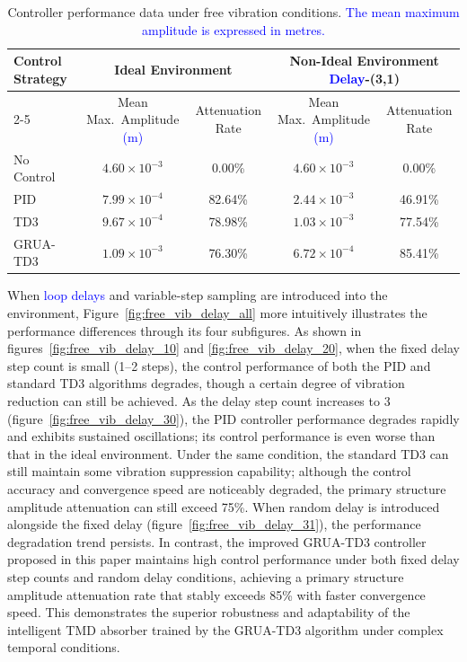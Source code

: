 \documentclass[review]{elsarticle}
\begin{document}
\begin{table}[htbp]
\centering
\caption{Controller performance data under free vibration conditions. \textcolor{blue}{The mean maximum amplitude is expressed in metres.}}
\label{tab:free_vib_data}
\small
\setlength{\tabcolsep}{4pt}
\begin{tabular}{lcccc} 
\toprule   
\multirow{2}{*}{Control Strategy} & \multicolumn{2}{c}{Ideal Environment} & \multicolumn{2}{c}{Non-Ideal Environment \textcolor{blue}{Delay}-(3,1)} \\ \cline{2-5}
& Mean Max.\ Amplitude \textcolor{blue}{(m)} & Attenuation Rate & Mean Max.\ Amplitude \textcolor{blue}{(m)} & Attenuation Rate \\ \midrule
No Control  & $4.60\times10^{-3}$ & 0.00\% & $4.60\times10^{-3}$ & 0.00\% \\
PID         & $7.99\times10^{-4}$ & 82.64\% & $2.44\times10^{-3}$ & 46.91\% \\
TD3         & $9.67\times10^{-4}$ & 78.98\% & $1.03\times10^{-3}$ & 77.54\% \\
GRUA-TD3    & $1.09\times10^{-3}$ & 76.30\% & $6.72\times10^{-4}$ & 85.41\% \\
\bottomrule  
\end{tabular}
\end{table}

When \textcolor{blue}{loop delays} and variable-step sampling are introduced into the environment, Figure~\ref{fig:free_vib_delay_all} more intuitively illustrates the performance differences through its four subfigures.
As shown in figures~\ref{fig:free_vib_delay_10} and \ref{fig:free_vib_delay_20}, when the fixed delay step count is small (1--2 steps), the control performance of both the PID and standard TD3 algorithms degrades, though a certain degree of vibration reduction can still be achieved.
As the delay step count increases to 3 (figure~\ref{fig:free_vib_delay_30}), the PID controller performance degrades rapidly and exhibits sustained oscillations; its control performance is even worse than that in the ideal environment.
Under the same condition, the standard TD3 can still maintain some vibration suppression capability; although the control accuracy and convergence speed are noticeably degraded, the primary structure amplitude attenuation can still exceed 75\%.
When random delay is introduced alongside the fixed delay (figure~\ref{fig:free_vib_delay_31}), the performance degradation trend persists.
In contrast, the improved GRUA-TD3 controller proposed in this paper maintains high control performance under both fixed delay step counts and random delay conditions, achieving a primary structure amplitude attenuation rate that stably exceeds 85\% with faster convergence speed.
This demonstrates the superior robustness and adaptability of the intelligent TMD absorber trained by the GRUA-TD3 algorithm under complex temporal conditions.
\end{document}
